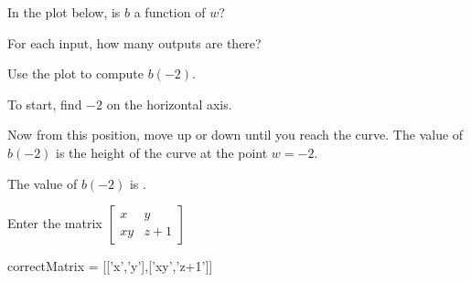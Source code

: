\documentclass{ximera}
\begin{document}
\begin{shuffle}
\begin{question}
In the plot below, is $b$ a function of $w$?
\begin{image}
\end{image}
\begin{solution}
\begin{multiple-choice}
\end{multiple-choice}
\begin{hint}
For each input, how many outputs are there?
\end{hint}
\end{solution}
Use the plot to compute $b(-2)$.
\begin{solution}
\begin{hint}
To start, find $-2$ on the horizontal axis. 
\end{hint}
\begin{hint}
Now from this position, move up or down until you reach the curve. The value of $b(-2)$ is the height of the curve at the point $w=-2$.
\end{hint}
The value of $b(-2)$ is .
\end{solution}
\end{question}
\end{shuffle}

\begin{question}
Enter the matrix  \(\begin{bmatrix} x & y \\ xy & z+1 \end{bmatrix}\)
\begin{matrixAnswer}[name=M]
  correctMatrix = [['x','y'],['xy','z+1']]
\end{matrixAnswer}
\end{question}
\end{document}
